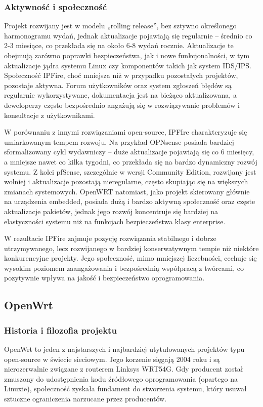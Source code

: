 \documentclass[12pt,a4paper]{article}
\begin{document}
\subsubsection{Aktywność i społeczność}
Projekt rozwijany jest w modelu „rolling release”, bez sztywno określonego harmonogramu wydań, jednak aktualizacje pojawiają się regularnie – średnio co 2-3 miesiące, co przekłada się na około 6-8 wydań rocznie. Aktualizacje te obejmują zarówno poprawki bezpieczeństwa, jak i nowe funkcjonalności, w tym aktualizacje jądra systemu Linux czy komponentów takich jak system IDS/IPS. Społeczność IPFire, choć mniejsza niż w przypadku pozostałych projektów, pozostaje aktywna. Forum użytkowników oraz system zgłoszeń błędów są regularnie wykorzystywane, dokumentacja jest na bieżąco aktualizowana, a deweloperzy często bezpośrednio angażują się w rozwiązywanie problemów i konsultacje z użytkownikami.

W porównaniu z innymi rozwiązaniami open-source, IPFIre charakteryzuje się umiarkowanym tempem rozwoju. Na przykład OPNsense posiada bardziej sformalizowany cykl wydawniczy – duże aktualizacje pojawiają się co 6 miesięcy, a mniejsze nawet co kilka tygodni, co przekłada się na bardzo dynamiczny rozwój systemu. Z kolei pfSense, szczególnie w wersji Community Edition, rozwijany jest wolniej i aktualizacje pozostają nieregularne, często skupiając się na większych zmianach systemowych. OpenWRT natomiast, jako projekt skierowany głównie na urządzenia embedded, posiada dużą i bardzo aktywną społeczność oraz częste aktualizacje pakietów, jednak jego rozwój koncentruje się bardziej na elastyczności systemu niż na funkcjach bezpieczeństwa klasy enterprise.

W rezultacie IPFire zajmuje pozycję rozwiązania stabilnego i dobrze utrzymywanego, lecz rozwijanego w bardziej konserwatywnym tempie niż niektóre konkurencyjne projekty. Jego społeczność, mimo mniejszej liczebności, cechuje się wysokim poziomem zaangażowania i bezpośrednią współpracą z twórcami, co pozytywnie wpływa na jakość i bezpieczeństwo oprogramowania.

\newpage

\subsection{OpenWrt}

\subsubsection{Historia i filozofia projektu}
OpenWrt to jeden z najstarszych i najbardziej utytułowanych projektów typu open-source w świecie sieciowym. Jego korzenie sięgają 2004 roku i są nierozerwalnie związane z routerem Linksys WRT54G. Gdy producent został zmuszony do udostępnienia kodu źródłowego oprogramowania (opartego na Linuxie), społeczność zyskała fundament do stworzenia systemu, który usuwał sztuczne ograniczenia narzucane przez producentów. 
\end{document}
